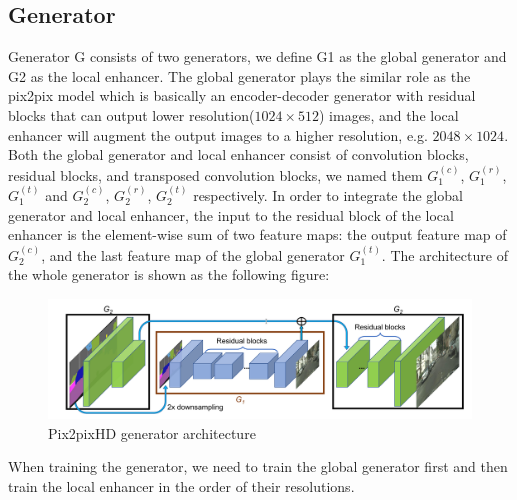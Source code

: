 \subsection{Generator}
Generator G consists of two generators, we define G1 as the global generator and G2 as 
the local enhancer. The global generator plays the similar role as the pix2pix model 
which is basically an encoder-decoder generator with residual blocks that can output 
lower resolution($1024\times512$) images, and the local enhancer will augment the 
output images to a higher resolution, e.g. $2048\times1024$. Both the global generator 
and local enhancer consist of convolution blocks, residual blocks, and transposed convolution blocks,
we named them $G_{1}^{(c)}$, $G_{1}^{(r)}$, $G_{1}^{(t)}$ and $G_{2}^{(c)}$, $G_{2}^{(r)}$, 
$G_{2}^{(t)}$ respectively. In order to integrate the global generator and local enhancer, 
the input to the residual block of the local enhancer is the 
element-wise sum of two feature maps: the output feature map of $G_{2}^{(c)}$, and the last 
feature map of the global generator $G_{1}^{(t)}$. The architecture of the whole generator 
is shown as the following figure:
\begin{figure}[H]
    \begin{center}
    \includegraphics[width=12cm]{figures/pix2pixHD-generator}
    \end{center}
    \caption{Pix2pixHD generator architecture}
    \label{fig:pix2pixHD-generator}
\end{figure}
When training the generator, we need to train the global generator first and then train the 
local enhancer in the order of their resolutions.


